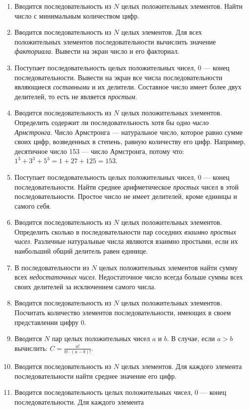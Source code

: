 \begin{enumerate}
\item Вводится последовательность из $N$ целых положительных элементов. Найти число с минимальным количеством цифр.
\item Вводится последовательность из $N$ целых элементов. Для всех положительных элементов последовательности вычислить
значение \emph{факториала}. Вывести на экран число и его факториал.
\item Поступает последовательность целых положительных чисел, 0 --- конец последовательности. Вывести на экран все числа
последовательности являющиеся \emph{составными} и их делители. Составное число имеет более двух делителей,
то есть не является \emph{простым}.
\item Вводится последовательность из $N$ целых положительных элементов. Определить содержит ли последовательность хотя бы
одно \emph{число Армстронга}. Число Армстронга --- натуральное число, которое равно сумме своих цифр,
возведенных в степень, равную количеству его цифр. Например, десятичное число 153 --- число Армстронга, потому что: 
$1^3+3^3+5^3=1+27+125=153.$ 
\item Поступает последовательность целых положительных чисел, 0 --- конец последовательности. Найти среднее арифметическое
\emph{простых} чисел в этой последовательности. Простое число не имеет делителей, кроме единицы и самого
себя.
\item Вводится последовательность из $N$ целых положительных элементов. Определить сколько в последовательности пар
соседних \emph{взаимно простых чисел}. Различные натуральные числа являются взаимно простыми, если их
наибольший общий делитель равен единице.
\item В последовательности из $N$ целых положительных элементов найти сумму всех \emph{недостаточных чисел}.
Недостаточное число всегда больше суммы всех своих делителей за исключением самого числа.
\item Вводится последовательность из $N$ целых положительных элементов. Посчитать количество элементов последовательности,
имеющих в своем представлении цифру 0.
\item Вводится $N$ пар целых положительных чисел $a$ и $b$. В случае, если
$a>b$ вычислить:
 $C=\frac{a!}{b!\cdot (a-b)!}$.
\item Вводится последовательность из $N$ целых элементов. Для каждого элемента последовательности найти среднее значение
его цифр.
\item Вводится последовательность целых положительных чисел, 0 --- конец последовательности. Для каждого элемента

\end{enumerate}
